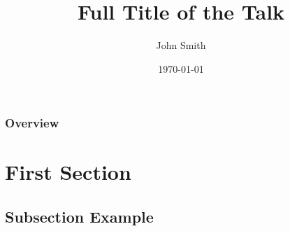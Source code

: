 \documentclass{beamer}
\title[Short title]{Full Title of the Talk} %
\author{John Smith} %
\institute[UCLA] %
{
University of California \\ %
\medskip
\textit{john@smith.com} %
}
\date{\today} %
\begin{document}
\begin{frame}
\titlepage %
\end{frame}

\begin{frame}
\frametitle{Overview} %
\tableofcontents %
\end{frame}


\section{First Section} %

\subsection{Subsection Example} %
\end{document}
